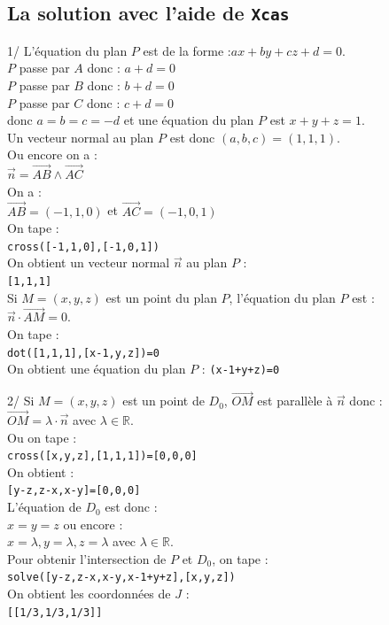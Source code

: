 \documentclass[a4paper,11pt]{book}
\begin{document}
\subsection{La solution avec l'aide de {\tt Xcas}}
1/ L'\'equation du plan $P$ est de la forme :$ax+by+cz+d=0$.\\
$P$ passe par $A$ donc : $a+d=0$\\
$P$ passe par $B$ donc : $b+d=0$\\
$P$ passe par $C$ donc : $c+d=0$\\
donc $a=b=c=-d$ et une \'equation du plan $P$ est $x+y+z=1$.\\
Un vecteur normal au plan $P$ est donc $(a,b,c)=(1,1,1)$.\\
Ou encore on a :\\
$\overrightarrow n=\overrightarrow{AB}\wedge\overrightarrow{AC}$\\
On a :\\
$\overrightarrow{AB}=(-1,1,0)$ et $\overrightarrow{AC}=(-1,0,1)$\\
On tape :\\
{\tt cross([-1,1,0],[-1,0,1])}\\
On obtient un vecteur normal $\overrightarrow n$ au plan $P$ :\\
{\tt [1,1,1]}\\
Si $M=(x,y,z)$ est un point du plan $P$, l'\'equation du plan $P$ est :\\
$\overrightarrow n \cdot \overrightarrow{AM}=0$.\\
On tape :\\
{\tt dot([1,1,1],[x-1,y,z])=0}\\
On obtient une \'equation du plan $P$ :
{\tt (x-1+y+z)=0}

2/ Si $M=(x,y,z)$ est un point de $D_0$, $\overrightarrow{OM}$ est parall\`ele
\`a $\overrightarrow n$ donc :\\
$\overrightarrow{OM}=\lambda \cdot \overrightarrow n$ 
avec $\lambda \in \mathbb R$.\\
Ou on tape :\\
{\tt cross([x,y,z],[1,1,1])=[0,0,0]}\\
On obtient :\\
{\tt [y-z,z-x,x-y]=[0,0,0]}\\
L'\'equation de $D_0$ est donc : \\
$x=y=z$ ou encore :\\
$x=\lambda,y=\lambda,z=\lambda$ avec $\lambda \in \mathbb R$.\\
Pour obtenir l'intersection de $P$ et $D_0$, on tape :\\
{\tt solve([y-z,z-x,x-y,x-1+y+z],[x,y,z])}\\
On obtient les coordonn\'ees de $J$ :\\
{\tt [[1/3,1/3,1/3]]}
\end{document}
